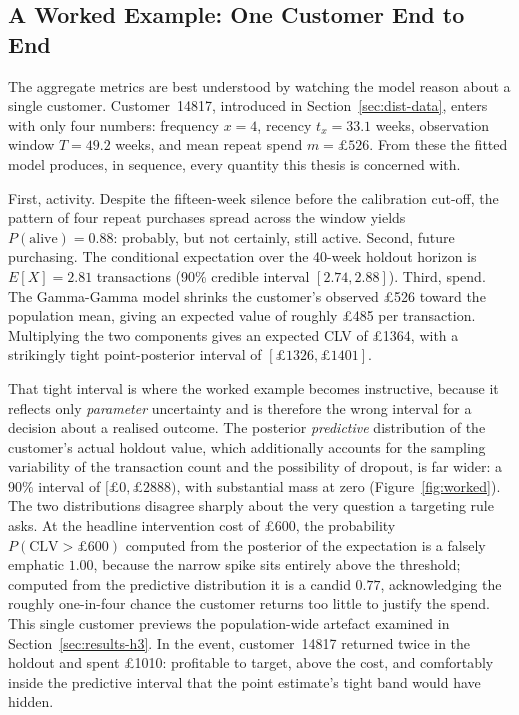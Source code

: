 

\subsection{A Worked Example: One Customer End to End}
\label{sec:worked-example}

The aggregate metrics are best understood by watching the model reason about a single customer. Customer~14817, introduced in Section~\ref{sec:dist-data}, enters with only four numbers: frequency $x = 4$, recency $t_x = 33.1$ weeks, observation window $T = 49.2$ weeks, and mean repeat spend $m = \pounds 526$. From these the fitted model produces, in sequence, every quantity this thesis is concerned with.

First, activity. Despite the fifteen-week silence before the calibration cut-off, the pattern of four repeat purchases spread across the window yields $P(\text{alive}) = 0.88$: probably, but not certainly, still active. Second, future purchasing. The conditional expectation over the 40-week holdout horizon is $E[X] = 2.81$ transactions (90\% credible interval $[2.74, 2.88]$). Third, spend. The Gamma-Gamma model shrinks the customer's observed \pounds 526 toward the population mean, giving an expected value of roughly \pounds 485 per transaction. Multiplying the two components gives an expected CLV of \pounds\num{1364}, with a strikingly tight point-posterior interval of $[\pounds\num{1326}, \pounds\num{1401}]$.

That tight interval is where the worked example becomes instructive, because it reflects only \emph{parameter} uncertainty and is therefore the wrong interval for a decision about a realised outcome. The posterior \emph{predictive} distribution of the customer's actual holdout value, which additionally accounts for the sampling variability of the transaction count and the possibility of dropout, is far wider: a 90\% interval of $[\pounds 0, \pounds\num{2888})$, with substantial mass at zero (Figure~\ref{fig:worked}). The two distributions disagree sharply about the very question a targeting rule asks. At the headline intervention cost of \pounds 600, the probability $P(\text{CLV} > \pounds 600)$ computed from the posterior of the expectation is a falsely emphatic $1.00$, because the narrow spike sits entirely above the threshold; computed from the predictive distribution it is a candid $0.77$, acknowledging the roughly one-in-four chance the customer returns too little to justify the spend. This single customer previews the population-wide artefact examined in Section~\ref{sec:results-h3}. In the event, customer~14817 returned twice in the holdout and spent \pounds\num{1010}: profitable to target, above the cost, and comfortably inside the predictive interval that the point estimate's tight band would have hidden.

